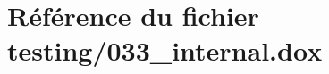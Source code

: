 \hypertarget{033__internal_8dox}{}\section{Référence du fichier testing/033\+\_\+internal.dox}
\label{033__internal_8dox}

